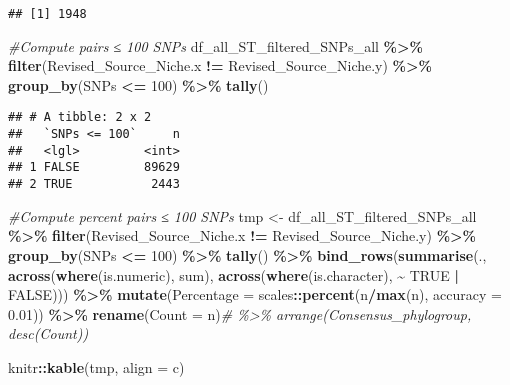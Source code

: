 \documentclass[
]{article}
\newenvironment{Shaded}{\begin{snugshade}}{\end{snugshade}}
\newcommand{\AttributeTok}[1]{\textcolor[rgb]{0.13,0.29,0.53}{#1}}
\newcommand{\CommentTok}[1]{\textcolor[rgb]{0.56,0.35,0.01}{\textit{#1}}}
\newcommand{\ConstantTok}[1]{\textcolor[rgb]{0.56,0.35,0.01}{#1}}
\newcommand{\DecValTok}[1]{\textcolor[rgb]{0.00,0.00,0.81}{#1}}
\newcommand{\FloatTok}[1]{\textcolor[rgb]{0.00,0.00,0.81}{#1}}
\newcommand{\FunctionTok}[1]{\textcolor[rgb]{0.13,0.29,0.53}{\textbf{#1}}}
\newcommand{\NormalTok}[1]{#1}
\newcommand{\OtherTok}[1]{\textcolor[rgb]{0.56,0.35,0.01}{#1}}
\newcommand{\SpecialCharTok}[1]{\textcolor[rgb]{0.81,0.36,0.00}{\textbf{#1}}}
\newcommand{\StringTok}[1]{\textcolor[rgb]{0.31,0.60,0.02}{#1}}
\begin{document}
\begin{verbatim}
## [1] 1948
\end{verbatim}

\begin{Shaded}
\begin{Highlighting}[]
\CommentTok{\#Compute pairs ≤ 100 SNPs}
\NormalTok{df\_all\_ST\_filtered\_SNPs\_all }\SpecialCharTok{\%\textgreater{}\%} \FunctionTok{filter}\NormalTok{(Revised\_Source\_Niche.x }\SpecialCharTok{!=}\NormalTok{ Revised\_Source\_Niche.y) }\SpecialCharTok{\%\textgreater{}\%} \FunctionTok{group\_by}\NormalTok{(SNPs }\SpecialCharTok{\textless{}=} \DecValTok{100}\NormalTok{) }\SpecialCharTok{\%\textgreater{}\%} \FunctionTok{tally}\NormalTok{()}
\end{Highlighting}
\end{Shaded}

\begin{verbatim}
## # A tibble: 2 x 2
##   `SNPs <= 100`     n
##   <lgl>         <int>
## 1 FALSE         89629
## 2 TRUE           2443
\end{verbatim}

\begin{Shaded}
\begin{Highlighting}[]
\CommentTok{\#Compute percent pairs ≤ 100 SNPs}
\NormalTok{tmp }\OtherTok{\textless{}{-}}\NormalTok{ df\_all\_ST\_filtered\_SNPs\_all }\SpecialCharTok{\%\textgreater{}\%} \FunctionTok{filter}\NormalTok{(Revised\_Source\_Niche.x }\SpecialCharTok{!=}\NormalTok{ Revised\_Source\_Niche.y) }\SpecialCharTok{\%\textgreater{}\%} \FunctionTok{group\_by}\NormalTok{(SNPs }\SpecialCharTok{\textless{}=} \DecValTok{100}\NormalTok{) }\SpecialCharTok{\%\textgreater{}\%} \FunctionTok{tally}\NormalTok{()  }\SpecialCharTok{\%\textgreater{}\%} 
  \FunctionTok{bind\_rows}\NormalTok{(}\FunctionTok{summarise}\NormalTok{(.,}
                      \FunctionTok{across}\NormalTok{(}\FunctionTok{where}\NormalTok{(is.numeric), sum),}
                      \FunctionTok{across}\NormalTok{(}\FunctionTok{where}\NormalTok{(is.character), }\SpecialCharTok{\textasciitilde{}} \ConstantTok{TRUE} \SpecialCharTok{|} \ConstantTok{FALSE}\NormalTok{))) }\SpecialCharTok{\%\textgreater{}\%}
  \FunctionTok{mutate}\NormalTok{(}\AttributeTok{Percentage =}\NormalTok{ scales}\SpecialCharTok{::}\FunctionTok{percent}\NormalTok{(n}\SpecialCharTok{/}\FunctionTok{max}\NormalTok{(n), }\AttributeTok{accuracy =} \FloatTok{0.01}\NormalTok{)) }\SpecialCharTok{\%\textgreater{}\%}
  \FunctionTok{rename}\NormalTok{(}\StringTok{\textquotesingle{}Count\textquotesingle{}} \OtherTok{=}\NormalTok{ n)}\CommentTok{\# \%\textgreater{}\% arrange(Consensus\_phylogroup, desc(Count))}

\NormalTok{knitr}\SpecialCharTok{::}\FunctionTok{kable}\NormalTok{(tmp, }\AttributeTok{align =} \StringTok{\textquotesingle{}c\textquotesingle{}}\NormalTok{)}
\end{Highlighting}
\end{Shaded}
\end{document}
